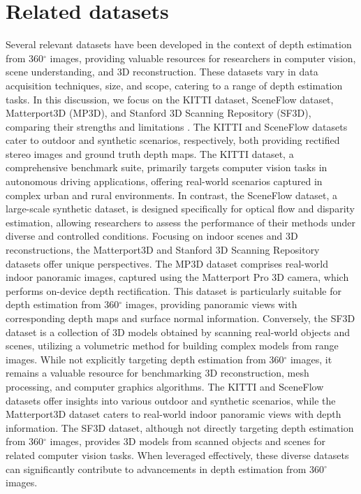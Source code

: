\documentclass[english, LaM, oneside]{sapthesis}%
\begin{document}
\section{Related datasets}
Several relevant datasets have been developed in the context of depth estimation from 360$^\circ$ images, providing valuable resources for researchers in computer vision, scene understanding, and 3D reconstruction. These datasets vary in data acquisition techniques, size, and scope, catering to a range of depth estimation tasks. In this discussion, we focus on the KITTI dataset, SceneFlow dataset, Matterport3D (MP3D), and Stanford 3D Scanning Repository (SF3D), comparing their strengths and limitations\cite{ref:d1}\cite{ref:d2} \cite{ref:d3}\cite{ref:SF3D}.
The KITTI and SceneFlow datasets cater to outdoor and synthetic scenarios, respectively, both providing rectified stereo images and ground truth depth maps. The KITTI dataset, a comprehensive benchmark suite, primarily targets computer vision tasks in autonomous driving applications, offering real-world scenarios captured in complex urban and rural environments. In contrast, the SceneFlow dataset, a large-scale synthetic dataset, is designed specifically for optical flow and disparity estimation, allowing researchers to assess the performance of their methods under diverse and controlled conditions.
Focusing on indoor scenes and 3D reconstructions, the Matterport3D and Stanford 3D Scanning Repository datasets offer unique perspectives. The MP3D dataset comprises real-world indoor panoramic images, captured using the Matterport Pro 3D camera, which performs on-device depth rectification. This dataset is particularly suitable for depth estimation from 360$^\circ$ images, providing panoramic views with corresponding depth maps and surface normal information. Conversely, the SF3D dataset is a collection of 3D models obtained by scanning real-world objects and scenes, utilizing a volumetric method for building complex models from range images. While not explicitly targeting depth estimation from 360$^\circ$ images, it remains a valuable resource for benchmarking 3D reconstruction, mesh processing, and computer graphics algorithms.
The KITTI and SceneFlow datasets offer insights into various outdoor and synthetic scenarios, while the Matterport3D dataset caters to real-world indoor panoramic views with depth information. The SF3D dataset, although not directly targeting depth estimation from 360$^\circ$ images, provides 3D models from scanned objects and scenes for related computer vision tasks. When leveraged effectively, these diverse datasets can significantly contribute to advancements in depth estimation from 360$^\circ$ images.
\end{document}
